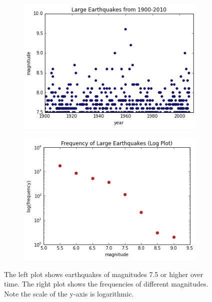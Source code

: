 \begin{figure}[H] %
\centering
\begin{subfigure}{.45\textwidth}
\centering
\includegraphics[width=\textwidth]{large_quake.png}
\end{subfigure}
\centering
\begin{subfigure}{.45\textwidth}
\centering
\includegraphics[width=\textwidth]{freq_earthquake_log.png}
\end{subfigure}
\caption{The left plot shows earthquakes of magnitudes 7.5 or higher over time. The right plot shows the frequencies of
different magnitudes. Note the scale of the y-axis is logarithmic.}
\label{fig:logexample}
\end{figure}

